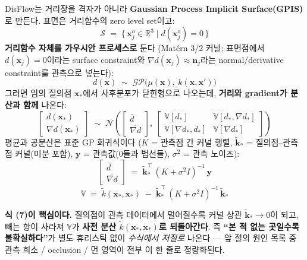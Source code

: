 DisFlow는 거리장을 격자가 아니라 \textbf{Gaussian Process Implicit
Surface(GPIS)}로 만든다. 표면은 거리함수의 zero level set이고:
\begin{equation*}
  \mathcal{S} \;=\; \big\{\, \mathbf{x}_j^o \in \mathbb{R}^3 \;\big|\;
  d(\mathbf{x}_j^o) = 0 \,\big\}
  \tag{3}
\end{equation*}
\textbf{거리함수 자체를 가우시안 프로세스로} 둔다 (Mat\'ern 3/2 커널;
표면점에서 $d(\mathbf{x}_j)=0$이라는 surface constraint와
$\nabla d(\mathbf{x}_j)\approx\mathbf{n}_j$라는 normal/derivative
constraint를 관측으로 넣는다):
\begin{equation*}
  d(\mathbf{x}) \;\sim\;
  \mathcal{GP}\big(\mu(\mathbf{x}),\ k(\mathbf{x},\mathbf{x}')\big)
  \tag{4}
\end{equation*}
그러면 임의 질의점 $\mathbf{x}_*$에서 사후분포가 닫힌형으로 나오는데,
\textbf{거리와 gradient가 분산과 함께} 나온다:
\begin{equation*}
  \begin{bmatrix} d(\mathbf{x}_*) \\ \nabla d(\mathbf{x}_*) \end{bmatrix}
  \;\sim\; \mathcal{N}\!\left(
  \begin{bmatrix} \bar{d} \\ \overline{\nabla d} \end{bmatrix},\
  \begin{bmatrix}
    \mathbb{V}[d_*] & \mathbb{V}[d_*, \nabla d_*] \\
    \mathbb{V}[\nabla d_*, d_*] & \mathbb{V}[\nabla d_*]
  \end{bmatrix}
  \right)
  \tag{5}
\end{equation*}
평균과 공분산은 표준 GP 회귀식이다 ($K$ = 관측점 간 커널 행렬,
$\tilde{\mathbf{k}}_*$ = 질의점--관측점 커널(미분 포함), $\mathbf{y}$ =
관측값(0들과 법선들), $\sigma^2$ = 관측 노이즈):
\begin{equation*}
  \begin{bmatrix} \bar{d} \\ \overline{\nabla d} \end{bmatrix}
  \;=\; \tilde{\mathbf{k}}_*^{\top}\,(K + \sigma^2 I)^{-1}\,\mathbf{y}
  \tag{6}
\end{equation*}
\begin{equation*}
  \mathbb{V} \;=\; \tilde{k}(\mathbf{x}_*,\mathbf{x}_*)
  \;-\; \tilde{\mathbf{k}}_*^{\top}\,(K + \sigma^2 I)^{-1}\,
  \tilde{\mathbf{k}}_*
  \tag{7}
\end{equation*}

\textbf{식 (7)이 핵심이다.} 질의점이 관측 데이터에서 멀어질수록 커널 상관
$\tilde{\mathbf{k}}_* \to 0$이 되고, 빼는 항이 사라져 $\mathbb{V}$가
\textbf{사전 분산 $\tilde{k}(\mathbf{x}_*,\mathbf{x}_*)$로 되돌아간다}.
즉 \textbf{``본 적 없는 곳일수록 불확실하다''}가 별도 휴리스틱 없이
\emph{수식에서 저절로} 나온다 --- 앞 절의 원인 목록 중 관측 희소 /
occlusion / 먼 영역이 전부 이 한 줄로 정량화된다.

